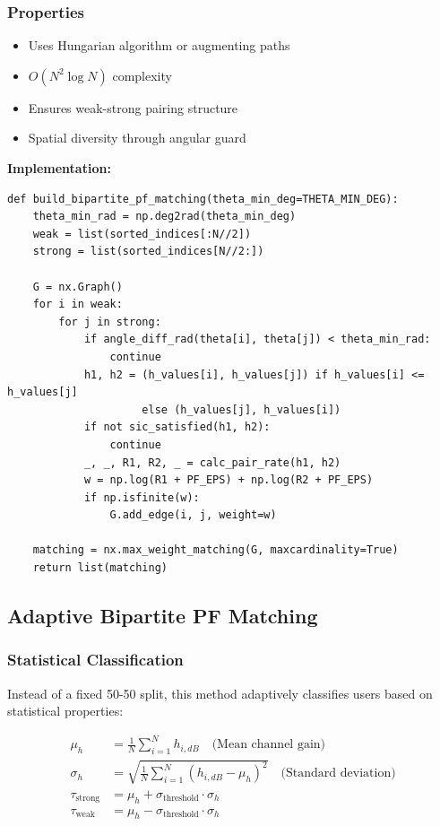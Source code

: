 \documentclass[12pt,a4paper]{article}
\begin{document}
\subsubsection{Properties}

\begin{itemize}
    \item Uses Hungarian algorithm or augmenting paths
    \item $O(N^2 \log N)$ complexity
    \item Ensures weak-strong pairing structure
    \item Spatial diversity through angular guard
\end{itemize}

\textbf{Implementation:}
\begin{lstlisting}[caption={Bipartite PF Matching}]
def build_bipartite_pf_matching(theta_min_deg=THETA_MIN_DEG):
    theta_min_rad = np.deg2rad(theta_min_deg)
    weak = list(sorted_indices[:N//2])
    strong = list(sorted_indices[N//2:])

    G = nx.Graph()
    for i in weak:
        for j in strong:
            if angle_diff_rad(theta[i], theta[j]) < theta_min_rad:
                continue
            h1, h2 = (h_values[i], h_values[j]) if h_values[i] <= h_values[j] 
                     else (h_values[j], h_values[i])
            if not sic_satisfied(h1, h2):
                continue
            _, _, R1, R2, _ = calc_pair_rate(h1, h2)
            w = np.log(R1 + PF_EPS) + np.log(R2 + PF_EPS)
            if np.isfinite(w):
                G.add_edge(i, j, weight=w)

    matching = nx.max_weight_matching(G, maxcardinality=True)
    return list(matching)
\end{lstlisting}

\subsection{Adaptive Bipartite PF Matching}

\subsubsection{Statistical Classification}

Instead of a fixed 50-50 split, this method adaptively classifies users based on statistical properties:

\begin{align}
\mu_h &= \frac{1}{N}\sum_{i=1}^N h_{i,dB} \quad \text{(Mean channel gain)} \\
\sigma_h &= \sqrt{\frac{1}{N}\sum_{i=1}^N (h_{i,dB} - \mu_h)^2} \quad \text{(Standard deviation)} \\
\tau_{\text{strong}} &= \mu_h + \sigma_{\text{threshold}} \cdot \sigma_h \\
\tau_{\text{weak}} &= \mu_h - \sigma_{\text{threshold}} \cdot \sigma_h
\end{align}
\end{document}
